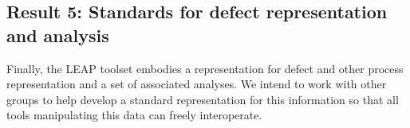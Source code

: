\subsection*{Result 5: Standards for defect representation and analysis}

Finally, the LEAP toolset embodies a representation for defect and other
process representation and a set of associated analyses. We intend to work
with other groups to help develop a standard representation for this
information so that all tools manipulating this data can freely
interoperate.



      

